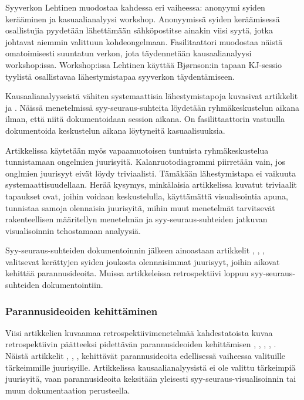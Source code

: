 Syyverkon Lehtinen muodostaa kahdessa eri vaiheessa: anonyymi syiden kerääminen ja kasuaalianalyysi workshop. Anonyymissä syiden keräämisessä osallistujia pyydetään lähettämään sähköpostitse ainakin viisi syytä, jotka johtavat aiemmin valittuun kohdeongelmaan. Fasilitaattori muodostaa näistä omatoimisesti suuntatun verkon, jota täydennetään kausaalianalyysi workshop:issa. Workshop:issa Lehtinen käyttää Bj{\o}rnson:in tapaan KJ-sessio tyylistä osallistavaa lähestymistapaa syyverkon täydentämiseen. \citep{Lehtinen2011}

Kausaalianalyyseistä vähiten systemaattisia lähestymistapoja kuvasivat artikkelit \citep{karlsson2006case} ja \citep{staalhane2003post}. Näissä menetelmissä syy-seuraus-suhteita löydetään ryhmäkeskustelun aikana ilman, että niitä dokumentoidaan session aikana. On fasilittaattorin vastuulla dokumentoida keskustelun aikana löytyneitä kasuaalisuuksia.

Artikkelissa \citep{card1998learning} käytetään myös vapaamuotoisen tuntuista ryhmäkeskustelua tunnistamaan ongelmien juurisyitä. Kalanruotodiagrammi piirretään vain, jos onglmien juurisyyt eivät löydy triviaalisti. Tämäkään lähestymistapa ei vaikuuta systemaattisuudellaan. Herää kysymys, minkälaisia artikkelissa kuvatut triviaalit tapaukset ovat, joihin voidaan keskustelulla, käyttämättä visualisointia apuna, tunnistaa samoja olennaisia juurisyitä, mihin muut menetelmät tarvitsevät rakenteellisen määritellyn menetelmän ja syy-seuraus-suhteiden jatkuvan visualisoinnin tehostamaan analyysiä.

Syy-seuraus-suhteiden dokumentoinnin jälkeen ainoastaan artikkelit \citep{card1998learning}, \citep{staalhane2004root}, \citep{karlsson2006case}, \citep{Lehtinen2011} valitsevat kerättyjen syiden joukosta olennaisimmat juurisyyt, joihin aikovat kehittää parannusideoita. Muissa artikkeleissa retrospektiivi loppuu syy-seuraus-suhteiden dokumentointiin.

\subsubsection{Parannusideoiden kehittäminen}

Viisi artikkelien kuvaamaa retrospektiivimenetelmää kahdestatoista kuvaa retrospektiivin päätteeksi pidettävän parannusideoiden kehittämisen \citep{card1998learning}, \citep{staalhane2003post}, \citep{staalhane2004root}, \citep{karlsson2006case}, \citep{Lehtinen2011}. Näistä artikkelit \citep{card1998learning}, \citep{staalhane2004root}, \citep{karlsson2006case}, \citep{Lehtinen2011} kehittävät parannusideoita edellisessä vaiheessa valituille tärkeimmille juurisyille. Artikkelissa \citep{staalhane2003post} kausaalianalyysistä ei ole valittu tärkeimpiä juurisyitä, vaan parannusideoita keksitään yleisesti syy-seuraus-visualisoinnin tai muun dokumentaation perusteella.

